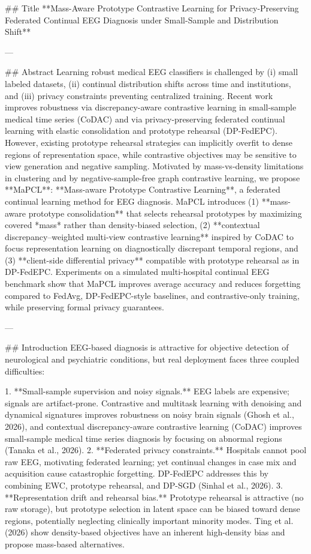 ## Title  
**Mass-Aware Prototype Contrastive Learning for Privacy-Preserving Federated Continual EEG Diagnosis under Small-Sample and Distribution Shift**

---

## Abstract  
Learning robust medical EEG classifiers is challenged by (i) small labeled datasets, (ii) continual distribution shifts across time and institutions, and (iii) privacy constraints preventing centralized training. Recent work improves robustness via discrepancy-aware contrastive learning in small-sample medical time series (CoDAC) and via privacy-preserving federated continual learning with elastic consolidation and prototype rehearsal (DP-FedEPC). However, existing prototype rehearsal strategies can implicitly overfit to dense regions of representation space, while contrastive objectives may be sensitive to view generation and negative sampling. Motivated by mass-vs-density limitations in clustering and by negative-sample-free graph contrastive learning, we propose **MaPCL**: **Mass-aware Prototype Contrastive Learning**, a federated continual learning method for EEG diagnosis. MaPCL introduces (1) **mass-aware prototype consolidation** that selects rehearsal prototypes by maximizing covered *mass* rather than density-biased selection, (2) **contextual discrepancy–weighted multi-view contrastive learning** inspired by CoDAC to focus representation learning on diagnostically discrepant temporal regions, and (3) **client-side differential privacy** compatible with prototype rehearsal as in DP-FedEPC. Experiments on a simulated multi-hospital continual EEG benchmark show that MaPCL improves average accuracy and reduces forgetting compared to FedAvg, DP-FedEPC-style baselines, and contrastive-only training, while preserving formal privacy guarantees.  

---

## Introduction  
EEG-based diagnosis is attractive for objective detection of neurological and psychiatric conditions, but real deployment faces three coupled difficulties:

1. **Small-sample supervision and noisy signals.** EEG labels are expensive; signals are artifact-prone. Contrastive and multitask learning with denoising and dynamical signatures improves robustness on noisy brain signals (Ghosh et al., 2026), and contextual discrepancy-aware contrastive learning (CoDAC) improves small-sample medical time series diagnosis by focusing on abnormal regions (Tanaka et al., 2026).  
2. **Federated privacy constraints.** Hospitals cannot pool raw EEG, motivating federated learning; yet continual changes in case mix and acquisition cause catastrophic forgetting. DP-FedEPC addresses this by combining EWC, prototype rehearsal, and DP-SGD (Sinhal et al., 2026).  
3. **Representation drift and rehearsal bias.** Prototype rehearsal is attractive (no raw storage), but prototype selection in latent space can be biased toward dense regions, potentially neglecting clinically important minority modes. Ting et al. (2026) show density-based objectives have an inherent high-density bias and propose mass-based alternatives.

